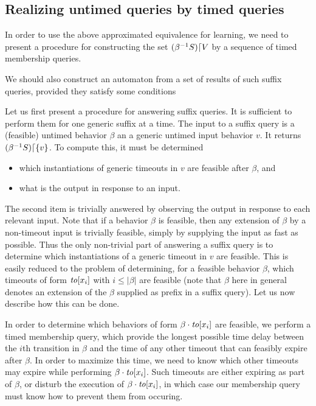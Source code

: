 
\subsection{Realizing untimed queries by timed queries}

In order to use the above approximated equivalence for learning, we need to
present a procedure for constructing the set
$({\beta}^{-1}{S})\lceil{V}$ by a sequence of timed membership queries.

We should also construct an automaton from a set of results of such
suffix queries, provided they satisfy some conditions

Let us first present a procedure for answering suffix queries. It is
sufficient to perform them for one generic suffix at a time.
The input to a suffix query is a (feasible) untimed behavior $\beta$ an a
generic untimed input behavior $v$. It returns
$({\beta}^{-1}{S})\lceil{\lbrace v\rbrace}$. To compute this, it must be determined
\begin{itemize}
\item which instantiations of generic timeouts in $v$ are feasible after $\beta$, and
\item what is the output in response to an input.
\end{itemize}
The second item is trivially answered by observing the output in response to
each relevant input. Note that if a behavior $\beta$ is feasible, then
any extension of $\beta$ by a non-timeout input is trivially feasible, simply
by supplying the input as fast as possible. Thus the only non-trivial part
of answering a suffix query is to determine which instantiations of a generic
timeout in $v$ are feasible. This is easily reduced to the problem of
determining, for a feasible behavior $\beta$, which timeouts of form
$\mathit{to}[x_i]$ with $i \leq |\beta|$ are feasible (note that $\beta$ here in
general denotes an extension of the $\beta$ supplied as prefix in a
suffix query). Let us now describe how this can be done.

In order to determine which behaviors of form $\beta \cdot \mathit{to}[x_i]$
are feasible, we perform a timed membership query, which provide the longest
possible time delay between the $i$th transition in $\beta$ and the time
of any other timeout that can feasibly expire after $\beta$. In order to
maximize this time, we need to know which other timeouts may expire while
performing $\beta \cdot \mathit{to}[x_i]$. Such timeouts are either expiring
as part of $\beta$, or disturb the execution of $\beta \cdot \mathit{to}[x_i]$,
in which case our membership query must know how to prevent them from occuring.


